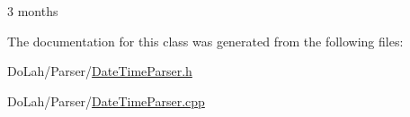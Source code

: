 3 months 



The documentation for this class was generated from the following files\+:\begin{DoxyCompactItemize}
\item 
Do\+Lah/\+Parser/\hyperlink{_date_time_parser_8h}{Date\+Time\+Parser.\+h}\item 
Do\+Lah/\+Parser/\hyperlink{_date_time_parser_8cpp}{Date\+Time\+Parser.\+cpp}\end{DoxyCompactItemize}
